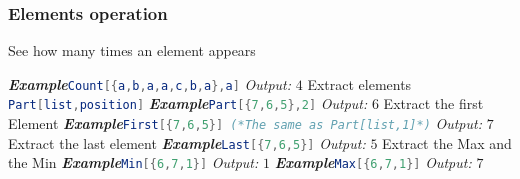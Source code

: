 \documentclass[10pt]{book}
\begin{document}
\subsubsection{Elements operation}
\noindent See how many times an element appears

\noindent\emph{\textbf{Example}}\quad \lstinline[language=Mathematica]|Count[{a,b,a,a,c,b,a},a]| \hspace{\fill}\emph{Output:} $4$
\newline
\newline
\noindent Extract elements
\newline
\noindent \lstinline[language=Mathematica]|Part[list,position]| 
\newline
\noindent\emph{\textbf{Example}}\quad \lstinline[language=Mathematica]|Part[{7,6,5},2]| \hspace{\fill}\emph{Output:} $6$
\newline
\newline
\noindent Extract the first Element
\newline
\noindent\emph{\textbf{Example}}\quad \lstinline[language=Mathematica]|First[{7,6,5}] (*The same as Part[list,1]*)| \hspace{\fill}\emph{Output:} $7$
\newline
\newline
\noindent Extract the last element
\newline
\noindent\emph{\textbf{Example}}\quad \lstinline[language=Mathematica]|Last[{7,6,5}]| \hspace{\fill}\emph{Output:} $5$
\newline
\newline
\noindent Extract the Max and the Min
\newline
\noindent\emph{\textbf{Example}}\quad \lstinline[language=Mathematica]|Min[{6,7,1}]| \hspace{\fill}\emph{Output:} $1$
\newline
\noindent\emph{\textbf{Example}}\quad \lstinline[language=Mathematica]|Max[{6,7,1}]| \hspace{\fill}\emph{Output:} $7$
\end{document}
